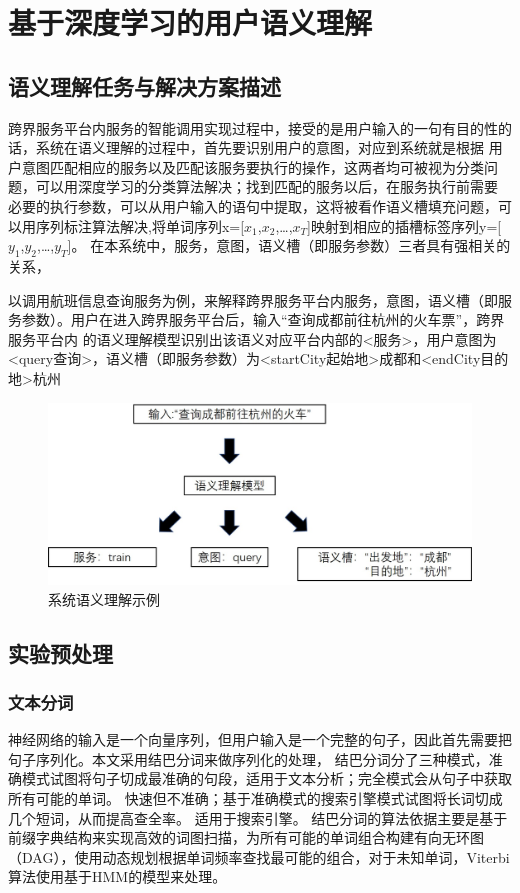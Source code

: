 \chapter{基于深度学习的用户语义理解}

\section{语义理解任务与解决方案描述}
跨界服务平台内服务的智能调用实现过程中，接受的是用户输入的一句有目的性的话，系统在语义理解的过程中，首先要识别用户的意图，对应到系统就是根据
用户意图匹配相应的服务以及匹配该服务要执行的操作，这两者均可被视为分类问题，可以用深度学习的分类算法解决；找到匹配的服务以后，在服务执行前需要
必要的执行参数，可以从用户输入的语句中提取，这将被看作语义槽填充问题，可以用序列标注算法解决,将单词序列x=[$x_{1}$,$x_{2}$,\dots,$x_{T}$]映射到相应的插槽标签序列y=[$y_{1}$,$y_{2}$,\dots,$y_{T}$]。
在本系统中，服务，意图，语义槽（即服务参数）三者具有强相关的关系，

以调用航班信息查询服务为例，来解释跨界服务平台内服务，意图，语义槽（即服务参数）。用户在进入跨界服务平台后，输入“查询成都前往杭州的火车票”，跨界服务平台内
的语义理解模型识别出该语义对应平台内部的<服务>，用户意图为<query查询>，语义槽（即服务参数）为<startCity起始地>成都和<endCity目的地>杭州


\begin{figure}[htbp]
    \centering
    \includegraphics[scale=0.5]{./images/questiondesc.jpg}
    \caption{系统语义理解示例}
    \label{fig:questiondesc}
  \end{figure}


\section{实验预处理}
\subsection{文本分词}
神经网络的输入是一个向量序列，但用户输入是一个完整的句子，因此首先需要把句子序列化。本文采用结巴分词来做序列化的处理，
结巴分词分了三种模式，准确模式试图将句子切成最准确的句段，适用于文本分析；完全模式会从句子中获取所有可能的单词。 快速但不准确；基于准确模式的搜索引擎模式试图将长词切成几个短词，从而提高查全率。 适用于搜索引擎。
结巴分词的算法依据主要是基于前缀字典结构来实现高效的词图扫描，为所有可能的单词组合构建有向无环图（DAG），使用动态规划根据单词频率查找最可能的组合，对于未知单词，Viterbi算法使用基于HMM的模型来处理。

